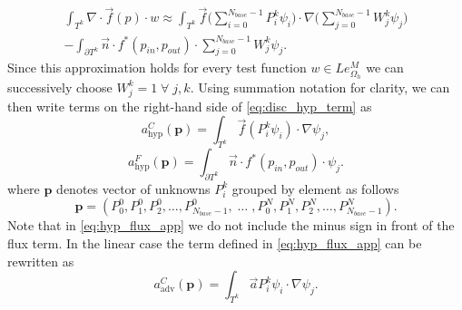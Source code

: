\begin{multline}
\label{eq:disc_hyp_term}
\int_{T^k} \nabla\cdot \vec{f}(p)\cdot w \approx \int_{T^k}
\vec{f}\Big(\sum\limits_{i=0}^{N_{base} - 1}
P_i^k\psi_i\Big)\cdot\nabla\Big(\sum\limits_{j=0}^{N_{base} - 1}
W_j^k\psi_j\Big)\\
-\int_{\partial{T^k}} \vec{n} \cdot f^{*} (p_{in}, p_{out})\cdot
\sum\limits_{j=0}^{N_{base} - 1} W_j^k\psi_j.
\end{multline}
Since this approximation holds for every test function $w \in
Le_{\Omega_h}^{M}$ we can successively choose $W_j^k = 1 \; \forall \;
j, k$. Using summation notation for clarity, we can then write terms on the  right-hand
side of \eqref{eq:disc_hyp_term} as
\begin{equation}
\label{eq:hyp_stiff_app}
a^C_\mathrm{hyp}(\mathbf{p}) = \int_{T^k} \vec{f}(P_i^k\psi_i)\cdot\nabla\psi_j,
\end{equation}
\begin{equation}
\label{eq:hyp_flux_app}
a^F_\mathrm{hyp}(\mathbf{p}) = \int_{\partial{T^k}} \vec{n} \cdot f^{*} (p_{in},
p_{out})\cdot\psi_j.
\end{equation}
where $\mathbf{p}$ denotes vector of unknowns $P^k_i$ grouped by element as follows
\begin{equation}
\mathbf{p} = \left(P^0_0, P^0_1, P^0_2, \ldots, P^0_{N_{base}-1}, \; \ldots \; ,
P^{N}_0, P^{N}_1, P^{N}_2, \ldots, P^{N}_{N_{base} - 1}  \right).
\end{equation}
Note that in \eqref{eq:hyp_flux_app} we do not include the minus sign in front
of the flux term. In the linear case the term defined in \eqref{eq:hyp_flux_app} can be
rewritten as
\begin{equation}
a^C_\mathrm{adv}(\mathbf{p}) = \int_{T^k} \vec{a}P_i^k\psi_i\cdot\nabla\psi_j.
\end{equation}


